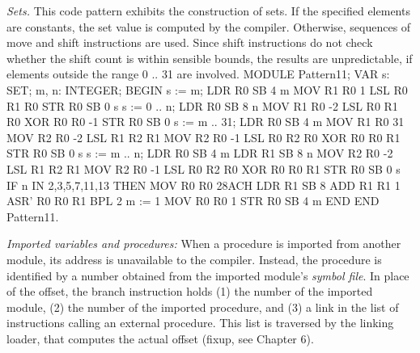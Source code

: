 \noindent {} \emph{Sets.} This code pattern exhibits the construction of sets. If the specified elements are constants, the set value is computed by the compiler. Otherwise, sequences of move and shift instructions are used. Since shift instructions do not check whether the shift count is within sensible bounds, the results are unpredictable, if elements outside the range 0 .. 31 are involved.
\begintt
MODULE Pattern11;
  VAR s: SET; m, n: INTEGER;
BEGIN
  s := {m};                       LDR  R0 SB 4      m
                                  MOV  R1 R0 1
                                  LSL  R0 R1 R0
                                  STR  R0 SB 0      s
  s := {0 .. n};                  LDR  R0 SB 8      n
                                  MOV  R1 R0 -2
                                  LSL  R0 R1 R0
                                  XOR  R0 R0 -1
                                  STR  R0 SB 0
  s := {m .. 31};                 LDR  R0 SB 4      m
                                  MOV  R1 R0 31
                                  MOV  R2 R0 -2
                                  LSL  R1 R2 R1
                                  MOV  R2 R0 -1
                                  LSL  R0 R2 R0
                                  XOR  R0 R0 R1
                                  STR  R0 SB 0      s
  s := {m .. n};                  LDR  R0 SB 4      m
                                  LDR  R1 SB 8      n
                                  MOV  R2 R0 -2
                                  LSL  R1 R2 R1
                                  MOV  R2 R0 -1
                                  LSL  R0 R2 R0
                                  XOR  R0 R0 R1
                                  STR  R0 SB 0      s
  IF n IN {2,3,5,7,11,13} THEN    MOV  R0 R0 28ACH
                                  LDR  R1 SB 8
                                  ADD  R1 R1 1
                                  ASR' R0 R0 R1
                                  BPL 2
  m := 1                          MOV  R0 R0 1
                                  STR  R0 SB 4      m
  END
END Pattern11.   
\endtt

\noindent {} \emph{Imported variables and procedures:} When a procedure is imported from another module, its address is unavailable to the compiler. Instead, the procedure is identified by a number obtained from the imported module's \emph{symbol file}. In place of the offset, the branch instruction holds (1) the number of the imported module, (2) the number of the imported procedure, and (3) a link in the list of  instructions calling an external procedure. This list is traversed by the linking loader, that computes the actual offset (fixup, see Chapter 6).

